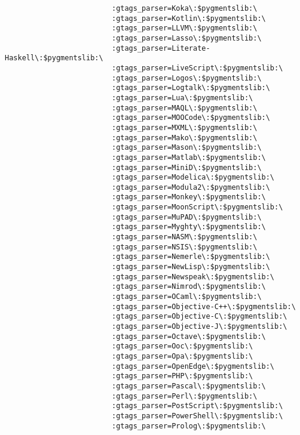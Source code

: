 \documentclass[11pt]{article}
\begin{document}
\begin{lstlisting}
                         :gtags_parser=Koka\:$pygmentslib:\
                         :gtags_parser=Kotlin\:$pygmentslib:\
                         :gtags_parser=LLVM\:$pygmentslib:\
                         :gtags_parser=Lasso\:$pygmentslib:\
                         :gtags_parser=Literate-Haskell\:$pygmentslib:\
                         :gtags_parser=LiveScript\:$pygmentslib:\
                         :gtags_parser=Logos\:$pygmentslib:\
                         :gtags_parser=Logtalk\:$pygmentslib:\
                         :gtags_parser=Lua\:$pygmentslib:\
                         :gtags_parser=MAQL\:$pygmentslib:\
                         :gtags_parser=MOOCode\:$pygmentslib:\
                         :gtags_parser=MXML\:$pygmentslib:\
                         :gtags_parser=Mako\:$pygmentslib:\
                         :gtags_parser=Mason\:$pygmentslib:\
                         :gtags_parser=Matlab\:$pygmentslib:\
                         :gtags_parser=MiniD\:$pygmentslib:\
                         :gtags_parser=Modelica\:$pygmentslib:\
                         :gtags_parser=Modula2\:$pygmentslib:\
                         :gtags_parser=Monkey\:$pygmentslib:\
                         :gtags_parser=MoonScript\:$pygmentslib:\
                         :gtags_parser=MuPAD\:$pygmentslib:\
                         :gtags_parser=Myghty\:$pygmentslib:\
                         :gtags_parser=NASM\:$pygmentslib:\
                         :gtags_parser=NSIS\:$pygmentslib:\
                         :gtags_parser=Nemerle\:$pygmentslib:\
                         :gtags_parser=NewLisp\:$pygmentslib:\
                         :gtags_parser=Newspeak\:$pygmentslib:\
                         :gtags_parser=Nimrod\:$pygmentslib:\
                         :gtags_parser=OCaml\:$pygmentslib:\
                         :gtags_parser=Objective-C++\:$pygmentslib:\
                         :gtags_parser=Objective-C\:$pygmentslib:\
                         :gtags_parser=Objective-J\:$pygmentslib:\
                         :gtags_parser=Octave\:$pygmentslib:\
                         :gtags_parser=Ooc\:$pygmentslib:\
                         :gtags_parser=Opa\:$pygmentslib:\
                         :gtags_parser=OpenEdge\:$pygmentslib:\
                         :gtags_parser=PHP\:$pygmentslib:\
                         :gtags_parser=Pascal\:$pygmentslib:\
                         :gtags_parser=Perl\:$pygmentslib:\
                         :gtags_parser=PostScript\:$pygmentslib:\
                         :gtags_parser=PowerShell\:$pygmentslib:\
                         :gtags_parser=Prolog\:$pygmentslib:\

\end{lstlisting}
\end{document}
